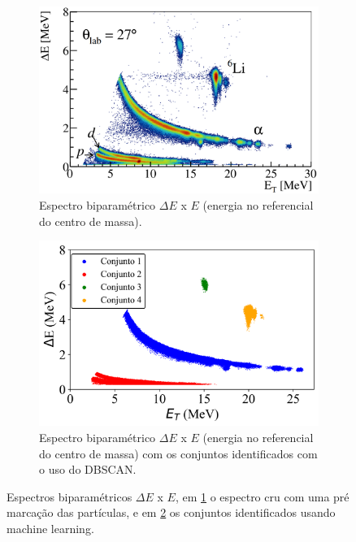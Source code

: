 \documentclass[a4paper,12pt,oneside]{book}
\begin{document}
\begin{appendices}
\begin{figure}[H]
\centering
    \begin{subfigure}[t]{0.48\textwidth}
        \centering
        \includegraphics[scale=0.21]{figs/espectro_1.png}
        \caption{Espectro biparamétrico $\Delta E$ x $E$ (energia no referencial do centro de massa).}
        \label{subfig:espectro_1}
    \end{subfigure}%
    \hfill
    \begin{subfigure}[t]{0.48\textwidth}
        \centering
        \includegraphics[scale=0.52]{figs/espectro_2.png}
        \caption{Espectro biparamétrico $\Delta E$ x $E$ (energia no referencial do centro de massa) com os conjuntos identificados com o uso do DBSCAN.}
        \label{subfig:espectro_2}
    \end{subfigure}
\caption{Espectros biparamétricos $\Delta E$ x $E$, em \ref{subfig:espectro_1} o espectro cru com uma pré marcação das partículas, e em \ref{subfig:espectro_2} os conjuntos identificados usando machine learning.}
\label{fig:espectros_ex_ml}
\end{figure}


\end{appendices}
\end{document}
